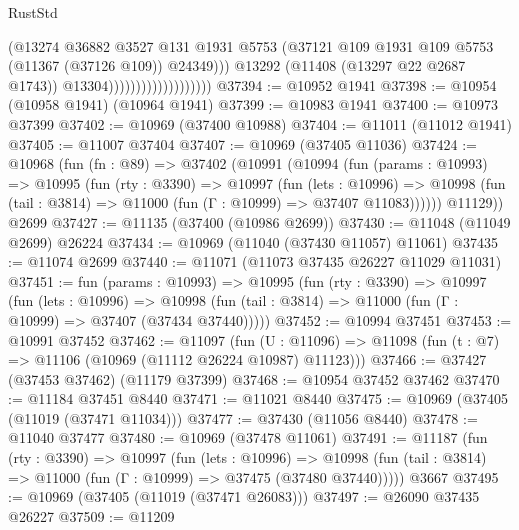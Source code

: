 \begin{lexlean}{RustStd}
\begin{coremodule}
                                            (@13274
                                              @36882
                                              @3527
                                              @131
                                              @1931
                                              @5753
                                              (@37121
                                                @109
                                                @1931
                                                @109
                                                @5753
                                                (@11367 (@37126 @109))
                                                @24349)))
                                          @13292
                                          (@11408 (@13297 @22 @2687 @1743))
                                          @13304)))))))))))))))))))
@37394 := @10952 @1941
@37398 := @10954 (@10958 @1941) (@10964 @1941)
@37399 := @10983 @1941
@37400 := @10973 @37399
@37402 := @10969 (@37400 @10988)
@37404 := @11011 (@11012 @1941)
@37405 := @11007 @37404
@37407 := @10969 (@37405 @11036)
@37424 := @10968
    (fun (fn : @89) =>
    @37402
      (@10991
        (@10994
          (fun (params : @10993) =>
          @10995
            (fun (rty : @3390) =>
            @10997
              (fun (lets : @10996) =>
              @10998 (fun (tail : @3814) => @11000 (fun (Γ : @10999) => @37407 @11083))))))
        @11129))
    @2699
@37427 := @11135 (@37400 (@10986 @2699))
@37430 := @11048 (@11049 @2699) @26224
@37434 := @10969 (@11040 (@37430 @11057) @11061)
@37435 := @11074 @2699
@37440 := @11071 (@11073 @37435 @26227 @11029 @11031)
@37451 := fun (params : @10993) =>
  @10995
    (fun (rty : @3390) =>
    @10997
      (fun (lets : @10996) =>
      @10998 (fun (tail : @3814) => @11000 (fun (Γ : @10999) => @37407 (@37434 @37440)))))
@37452 := @10994 @37451
@37453 := @10991 @37452
@37462 := @11097
    (fun (U : @11096) => @11098 (fun (t : @7) => @11106 (@10969 (@11112 @26224 @10987) @11123)))
@37466 := @37427 (@37453 @37462) (@11179 @37399)
@37468 := @10954 @37452 @37462
@37470 := @11184 @37451 @8440
@37471 := @11021 @8440
@37475 := @10969 (@37405 (@11019 (@37471 @11034)))
@37477 := @37430 (@11056 @8440)
@37478 := @11040 @37477
@37480 := @10969 (@37478 @11061)
@37491 := @11187
    (fun (rty : @3390) =>
    @10997
      (fun (lets : @10996) =>
      @10998 (fun (tail : @3814) => @11000 (fun (Γ : @10999) => @37475 (@37480 @37440)))))
    @3667
@37495 := @10969 (@37405 (@11019 (@37471 @26083)))
@37497 := @26090 @37435 @26227
@37509 := @11209

\end{coremodule}
\end{lexlean}
